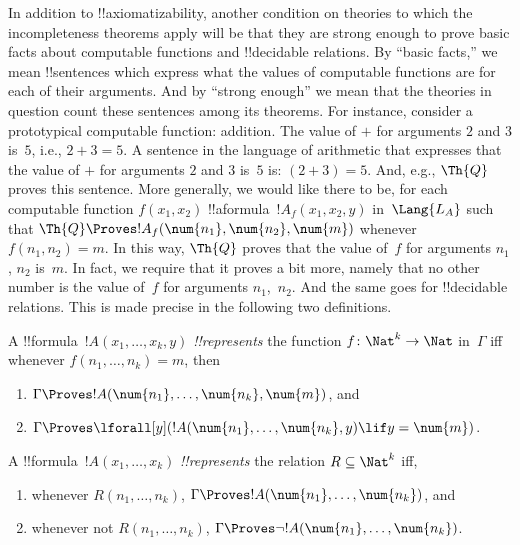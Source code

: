 \documentclass[../../../include/open-logic-section]{subfiles}
\begin{document}
In addition to !!{axiomatizability}, another condition on theories to
which the incompleteness theorems apply will be that they are strong
enough to prove basic facts about computable functions and
!!{decidable} relations. By ``basic facts,'' we mean !!{sentence}s
which express what the values of computable functions are for each of
their arguments.  And by ``strong enough'' we mean that the theories
in question count these sentences among its theorems. For instance,
consider a prototypical computable function: addition.  The value of
$+$ for arguments $2$ and $3$ is~$5$, i.e., $2+3 = 5$. A sentence in
the language of arithmetic that expresses that the value of $+$ for
arguments $2$ and $3$ is~$5$ is: $(\num{2} + \num{3}) = \num{5}$.
And, e.g., $\Th{Q}$ proves this sentence.  More generally, we would
like there to be, for each computable function $f(x_1, x_2)$
!!a{formula}~$!A_f(x_1, x_2, y)$ in~$\Lang{L_A}$ such that $\Th{Q}
\Proves !A_f(\num{n_1}, \num{n_2}, \num{m})$ whenever $f(n_1, n_2) =
m$. In this way, $\Th{Q}$ proves that the value of~$f$ for arguments
$n_1$, $n_2$ is~$m$. In fact, we require that it proves a bit more,
namely that no other number is the value of~$f$ for arguments
$n_1$,~$n_2$. And the same goes for !!{decidable} relations. This is
made precise in the following two definitions.

\begin{defn}
A !!{formula}~$!A(x_1, \dots, x_k, y)$ \emph{!!{represents}} the
function $f\colon \Nat^k \to \Nat$ in~$\Gamma$ iff whenever $f(n_1,
\dots, n_k) = m$, then
\begin{enumerate}
\item $\Gamma \Proves !A(\num{n_1}, \dots, \num{n_k}, \num{m})$, and
\item $\Gamma \Proves \lforall[y](!A(\num{n_1}, \dots, \num{n_k},
y) \lif y = \num{m})$.
\end{enumerate}
\end{defn}

\begin{defn}
A !!{formula}~$!A(x_1, \dots, x_k)$ \emph{!!{represents}} the
relation $R \subseteq \Nat^k$ iff,
\begin{enumerate}
\item whenever $R(n_1, \dots, n_k)$, $\Gamma \Proves !A(\num{n_1},
\dots, \num{n_k})$, and
\item whenever not $R(n_1, \dots, n_k)$, $\Gamma \Proves \lnot
!A(\num{n_1}, \dots, \num{n_k})$.
\end{enumerate}
\end{defn}
\end{document}
